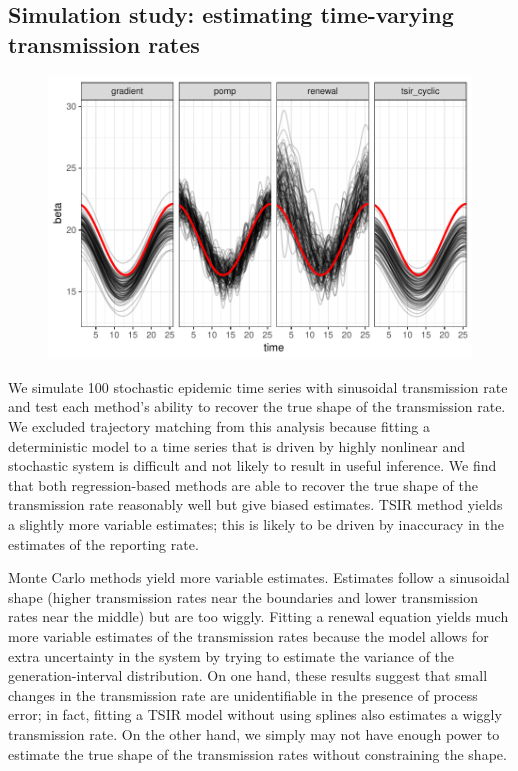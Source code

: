 \documentclass{article}
\begin{document}
\subsection{Simulation study: estimating time-varying transmission rates}

\begin{figure}[!t]
\includegraphics[width=\textwidth]{../figure/compare_transmission.pdf}
\end{figure}

We simulate 100 stochastic epidemic time series with sinusoidal transmission rate and test each method's ability to recover the true shape of the transmission rate.
We excluded trajectory matching from this analysis because fitting a deterministic model to a time series that is driven by highly nonlinear and stochastic system is difficult and not likely to result in useful inference. 
We find that both regression-based methods are able to recover the true shape of the transmission rate reasonably well but give biased estimates.
TSIR method yields a slightly more variable estimates; this is likely to be driven by inaccuracy in the estimates of the reporting rate. 

Monte Carlo methods yield more variable estimates.
Estimates follow a sinusoidal shape (higher transmission rates near the boundaries and lower transmission rates near the middle) but are too wiggly.
Fitting a renewal equation yields much more variable estimates of the transmission rates because the model allows for extra uncertainty in the system by trying to estimate the variance of the generation-interval distribution.
On one hand, these results suggest that small changes in the transmission rate are unidentifiable in the presence of process error;
in fact, fitting a TSIR model without using splines also estimates a wiggly transmission rate.
On the other hand, we simply may not have enough power to estimate the true shape of the transmission rates without constraining the shape.
\end{document}
